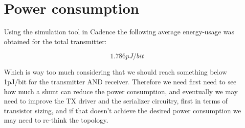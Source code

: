 \section{Power consumption}

Using the simulation tool in Cadence the following average energy-usage was obtained for the total transmitter:

$$1.786pJ/bit$$

\noindent Which is way too much considering that we should reach something below 1pJ/bit for the transmitter AND receiver.
Therefore we need first need to see how much a shunt can reduce the power consumption, and eventually we may need to improve the TX driver and the serializer circuitry, first in terms of transistor sizing, and if that doesn't achieve the desired power consumption we may need to re-think the topology.


